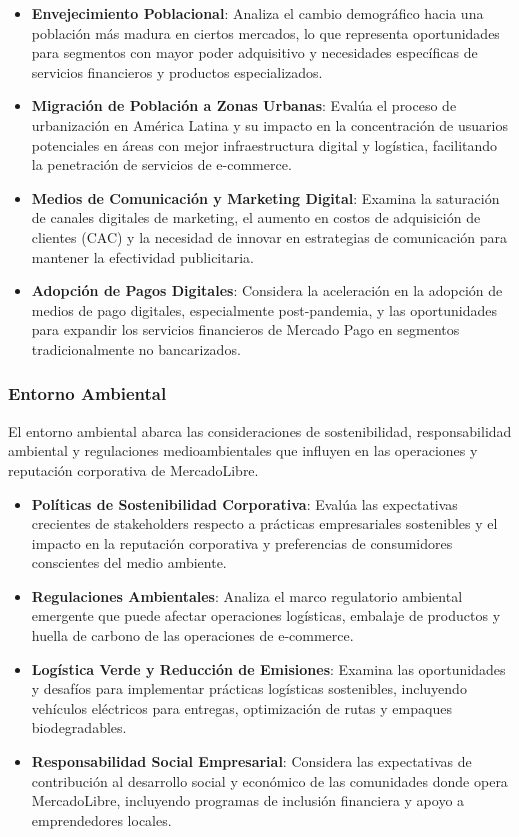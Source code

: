 \begin{itemize}
\item \textbf{Envejecimiento Poblacional}: Analiza el cambio demográfico hacia una población más madura en ciertos mercados, lo que representa oportunidades para segmentos con mayor poder adquisitivo y necesidades específicas de servicios financieros y productos especializados.

\item \textbf{Migración de Población a Zonas Urbanas}: Evalúa el proceso de urbanización en América Latina y su impacto en la concentración de usuarios potenciales en áreas con mejor infraestructura digital y logística, facilitando la penetración de servicios de e-commerce.

\item \textbf{Medios de Comunicación y Marketing Digital}: Examina la saturación de canales digitales de marketing, el aumento en costos de adquisición de clientes (CAC) y la necesidad de innovar en estrategias de comunicación para mantener la efectividad publicitaria.

\item \textbf{Adopción de Pagos Digitales}: Considera la aceleración en la adopción de medios de pago digitales, especialmente post-pandemia, y las oportunidades para expandir los servicios financieros de Mercado Pago en segmentos tradicionalmente no bancarizados.
\end{itemize}

\subsubsection{Entorno Ambiental}

El entorno ambiental abarca las consideraciones de sostenibilidad, responsabilidad ambiental y regulaciones medioambientales que influyen en las operaciones y reputación corporativa de MercadoLibre.

\begin{itemize}
\item \textbf{Políticas de Sostenibilidad Corporativa}: Evalúa las expectativas crecientes de stakeholders respecto a prácticas empresariales sostenibles y el impacto en la reputación corporativa y preferencias de consumidores conscientes del medio ambiente.

\item \textbf{Regulaciones Ambientales}: Analiza el marco regulatorio ambiental emergente que puede afectar operaciones logísticas, embalaje de productos y huella de carbono de las operaciones de e-commerce.

\item \textbf{Logística Verde y Reducción de Emisiones}: Examina las oportunidades y desafíos para implementar prácticas logísticas sostenibles, incluyendo vehículos eléctricos para entregas, optimización de rutas y empaques biodegradables.

\item \textbf{Responsabilidad Social Empresarial}: Considera las expectativas de contribución al desarrollo social y económico de las comunidades donde opera MercadoLibre, incluyendo programas de inclusión financiera y apoyo a emprendedores locales.
\end{itemize}

